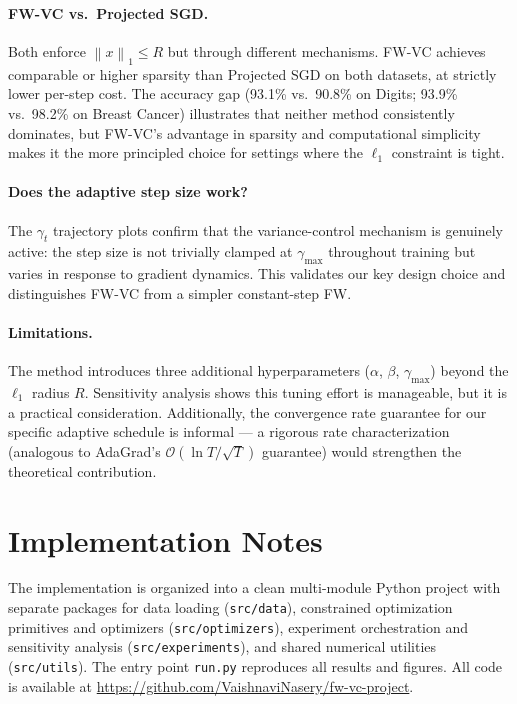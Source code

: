 \documentclass[10pt,twocolumn]{article}
\newcommand{\norm}[1]{\left\|#1\right\|}
\begin{document}
\paragraph{FW-VC vs.\ Projected SGD.}
Both enforce $\norm{x}_1 \leq R$ but through different mechanisms. FW-VC
achieves comparable or higher sparsity than Projected SGD on both
datasets, at strictly lower per-step cost. The accuracy gap (93.1\% vs.\
90.8\% on Digits; 93.9\% vs.\ 98.2\% on Breast Cancer) illustrates that
neither method consistently dominates, but FW-VC's advantage in sparsity
and computational simplicity makes it the more principled choice for
settings where the $\ell_1$ constraint is tight.

\paragraph{Does the adaptive step size work?}
The $\gamma_t$ trajectory plots confirm that the variance-control
mechanism is genuinely active: the step size is not trivially clamped at
$\gamma_{\max}$ throughout training but varies in response to gradient
dynamics. This validates our key design choice and distinguishes FW-VC
from a simpler constant-step FW.

\paragraph{Limitations.}
The method introduces three additional hyperparameters ($\alpha$, $\beta$,
$\gamma_{\max}$) beyond the $\ell_1$ radius $R$. Sensitivity analysis
shows this tuning effort is manageable, but it is a practical
consideration. Additionally, the convergence rate guarantee for our
specific adaptive schedule is informal — a rigorous rate characterization
(analogous to AdaGrad's $\mathcal{O}(\ln T/\sqrt{T})$ guarantee) would
strengthen the theoretical contribution.


\section{Implementation Notes}
\label{sec:impl}

The implementation is organized into a clean multi-module Python project
with separate packages for data loading (\texttt{src/data}), constrained
optimization primitives and optimizers (\texttt{src/optimizers}),
experiment orchestration and sensitivity analysis
(\texttt{src/experiments}), and shared numerical utilities
(\texttt{src/utils}). The entry point \texttt{run.py} reproduces all
results and figures. All code is available at
\url{https://github.com/VaishnaviNasery/fw-vc-project}.
\end{document}
